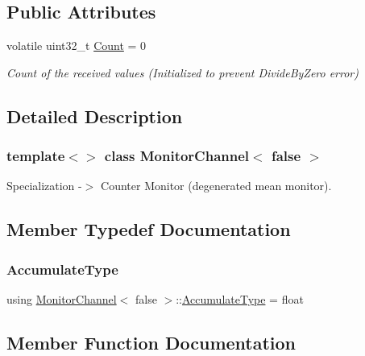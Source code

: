 \subsection*{Public Attributes}
\begin{DoxyCompactItemize}
\item 
volatile uint32\+\_\+t \hyperlink{classMonitorChannel_3_01false_01_4_a9642a29309b4919130d0fb9573af3a05}{Count} = 0
\begin{DoxyCompactList}\small\item\em Count of the received values (Initialized to prevent Divide\+By\+Zero error) \end{DoxyCompactList}\end{DoxyCompactItemize}


\subsection{Detailed Description}
\subsubsection*{template$<$$>$\newline
class Monitor\+Channel$<$ false $>$}

Specialization -\/$>$ Counter Monitor (degenerated mean monitor). 

\subsection{Member Typedef Documentation}
\mbox{\label{classMonitorChannel_3_01false_01_4_ac36f4071aff4c11fda63ff839d13345c}} 
\subsubsection{\texorpdfstring{Accumulate\+Type}{AccumulateType}}
{\footnotesize\ttfamily using \hyperlink{classMonitorChannel}{Monitor\+Channel}$<$ false $>$\+::\hyperlink{classMonitorChannel_3_01false_01_4_ac36f4071aff4c11fda63ff839d13345c}{Accumulate\+Type} =  float}



\subsection{Member Function Documentation}
\mbox{\label{classMonitorChannel_3_01false_01_4_a55677fe669bca6b9382fc3baa73162b9}} 
